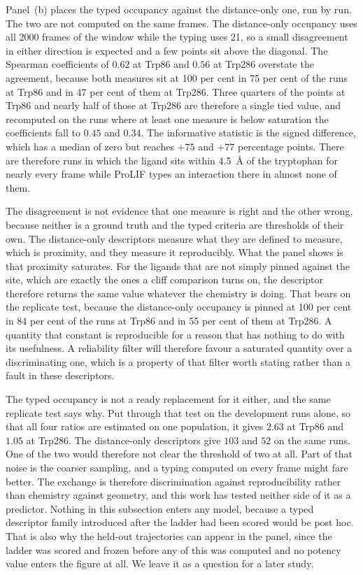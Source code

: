 Panel~(b) places the typed occupancy against the distance-only one, run by run. The two
are not computed on the same frames. The distance-only occupancy uses all 2000 frames
of the window while the typing uses 21, so a small disagreement in either direction is
expected and a few points sit above the diagonal. The Spearman coefficients of $0.62$
at Trp86 and $0.56$ at Trp286 overstate the agreement, because both measures sit at 100
per cent in 75 per cent of the runs at Trp86 and in 47 per cent of them at Trp286. Three
quarters of the points at Trp86 and nearly half of those at Trp286 are therefore a
single tied value, and recomputed on the runs where at least one measure is below
saturation the coefficients fall to $0.45$ and $0.34$. The informative statistic is the
signed difference, which has a median of zero but reaches $+75$ and $+77$ percentage
points. There are therefore runs in which the ligand sits within \SI{4.5}{\angstrom} of
the tryptophan for nearly every frame while ProLIF types an interaction there in almost
none of them.

The disagreement is not evidence that one measure is right and the other wrong, because
neither is a ground truth and the typed criteria are thresholds of their own. The
distance-only descriptors measure what they are defined to measure, which is proximity,
and they measure it reproducibly. What the panel shows is that proximity saturates. For
the ligands that are not simply pinned against the site, which are exactly the ones a
cliff comparison turns on, the descriptor therefore returns the same value whatever the
chemistry is doing. That bears on the replicate test, because the distance-only
occupancy is pinned at 100 per cent in 84 per cent of the runs at Trp86 and in 55 per
cent of them at Trp286. A quantity that constant is reproducible for a reason that has
nothing to do with its usefulness. A reliability filter will therefore favour a saturated quantity over a
discriminating one, which is a property of that filter worth stating rather than a
fault in these descriptors.

The typed occupancy is not a ready replacement for it either, and the same replicate
test says why. Put through that test on the development runs alone, so that all four
ratios are estimated on one population, it gives $2.63$ at Trp86 and $1.05$ at Trp286.
The distance-only descriptors give $103$ and $52$ on the same runs. One of the two would
therefore not clear the threshold of two at all. Part of that noise is the coarser
sampling, and a typing computed on every frame might fare better. The exchange is
therefore discrimination against reproducibility rather than chemistry against
geometry, and this work has tested neither side of it as a predictor. Nothing in this
subsection enters any model, because a typed descriptor family introduced after the
ladder had been scored would be post hoc. That is also why the held-out trajectories
can appear in the panel, since the ladder was scored and frozen before any of this was
computed and no potency value enters the figure at all. We leave it as a question for a later study.

